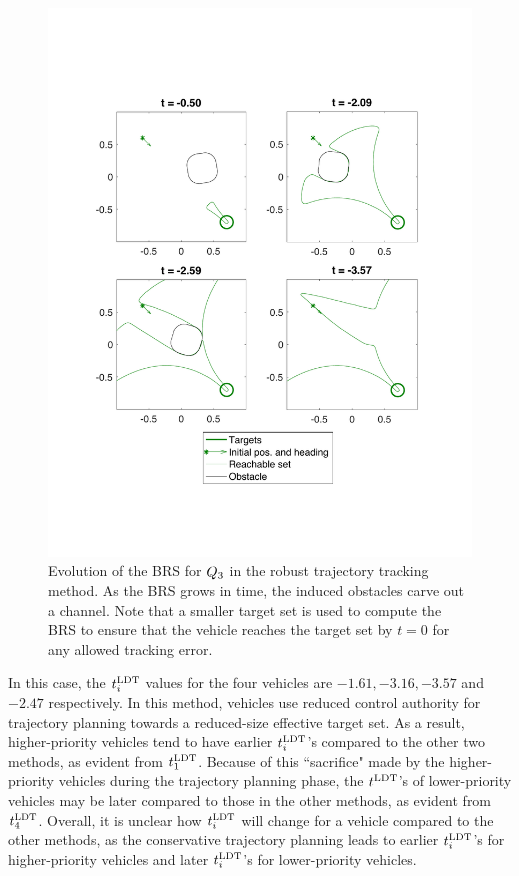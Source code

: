 \begin{figure}
  \centering
  \includegraphics[width=0.9\columnwidth]{fig/rtt_rs3}
  \caption{Evolution of the BRS for $Q_3$ in the robust trajectory tracking method. As the BRS grows in time, the induced obstacles carve out a channel. Note that a smaller target set is used to compute the BRS to ensure that the vehicle reaches the target set by $t=0$ for any allowed tracking error.}
  \label{fig:rtt_rs3}
\end{figure}

In this case, the $t^\text{LDT}_i$ values for the four vehicles are $-1.61, -3.16, -3.57$ and $-2.47$ respectively. In this method, vehicles use reduced control authority for trajectory planning towards a reduced-size effective target set. As a result, higher-priority vehicles tend to have earlier $t^\text{LDT}_i$'s compared to the other two methods, as evident from $t^\text{LDT}_1$. Because of this ``sacrifice" made by the higher-priority vehicles during the trajectory planning phase, the $t^\text{LDT}$'s of lower-priority vehicles may be later compared to those in the other methods, as evident from $t^\text{LDT}_4$. Overall, it is unclear how $t^\text{LDT}_i$ will change for a vehicle compared to the other methods, as the conservative trajectory planning leads to earlier $t^\text{LDT}_i$'s for higher-priority vehicles and later $t^\text{LDT}_i$'s for lower-priority vehicles.